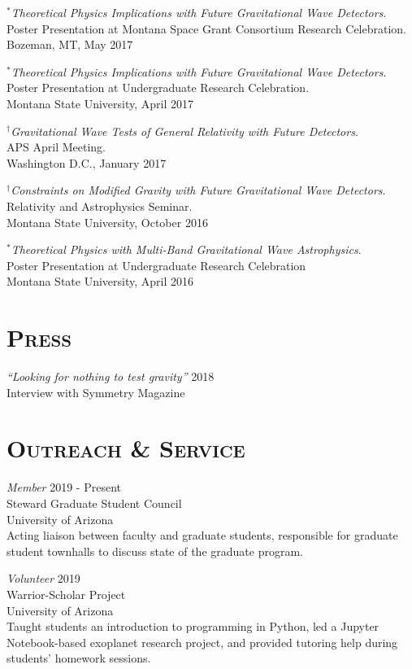 \documentclass[margin]{res}
\begin{document}
\begin{resume}
\emph{$^{*}$Theoretical Physics Implications with Future Gravitational Wave Detectors}.\\
Poster Presentation at Montana Space Grant Consortium Research Celebration. \\
Bozeman, MT, May 2017

\emph{$^{*}$Theoretical Physics Implications with Future Gravitational Wave Detectors}. \\
Poster Presentation at Undergraduate Research Celebration.\\
Montana State University, April 2017

\emph{${}^{\dagger}$Gravitational Wave Tests of General Relativity with Future Detectors}.\\
APS April Meeting. \\
Washington D.C., January 2017

\emph{${}^{\dagger}$Constraints on Modified Gravity with Future Gravitational Wave Detectors}. \\
Relativity and Astrophysics Seminar. \\
Montana State University, October 2016

\emph{$^{*}$Theoretical Physics with Multi-Band Gravitational Wave Astrophysics}. \\
Poster Presentation at Undergraduate Research Celebration\\  Montana State University, April 2016
\bigskip


\section{\textsc{Press}}
{\sl ``Looking for nothing to test gravity''} \hfill 2018\\
Interview with Symmetry Magazine

\section{\textsc{Outreach \& Service}}
{\sl Member }\hfill 2019 - Present\\
Steward Graduate Student Council\\
University of Arizona\\
{\footnotesize Acting liaison between faculty and graduate students, responsible for graduate student townhalls to discuss state of the graduate program. }

{\sl Volunteer }\hfill 2019\\
Warrior-Scholar Project\\
University of Arizona\\
{\footnotesize Taught students an introduction to programming in Python, led a Jupyter Notebook-based exoplanet research project, and provided tutoring help during students' homework sessions.}


\end{resume}
\end{document}
